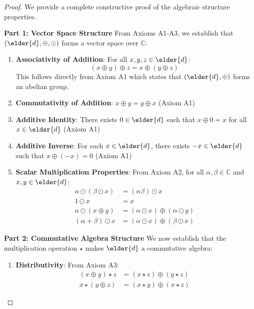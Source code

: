 \begin{proof}
We provide a complete constructive proof of the algebraic structure properties.

\textbf{Part 1: Vector Space Structure}
From Axioms A1-A3, we establish that $(\elder{d}, \oplus, \odot)$ forms a vector space over $\mathbb{C}$:
\begin{enumerate}
    \item \textbf{Associativity of Addition}: For all $x, y, z \in \elder{d}$:
    \begin{equation}
    (x \oplus y) \oplus z = x \oplus (y \oplus z)
    \end{equation}
    This follows directly from Axiom A1 which states that $(\elder{d}, \oplus)$ forms an abelian group.
    
    \item \textbf{Commutativity of Addition}: $x \oplus y = y \oplus x$ (Axiom A1)
    
    \item \textbf{Additive Identity}: There exists $0 \in \elder{d}$ such that $x \oplus 0 = x$ for all $x \in \elder{d}$ (Axiom A1)
    
    \item \textbf{Additive Inverse}: For each $x \in \elder{d}$, there exists $-x \in \elder{d}$ such that $x \oplus (-x) = 0$ (Axiom A1)
    
    \item \textbf{Scalar Multiplication Properties}: From Axiom A2, for all $\alpha, \beta \in \mathbb{C}$ and $x, y \in \elder{d}$:
    \begin{align}
        \alpha \odot (\beta \odot x) &= (\alpha\beta) \odot x \\
        1 \odot x &= x \\
        \alpha \odot (x \oplus y) &= (\alpha \odot x) \oplus (\alpha \odot y) \\
        (\alpha + \beta) \odot x &= (\alpha \odot x) \oplus (\beta \odot x)
    \end{align}
\end{enumerate}

\textbf{Part 2: Commutative Algebra Structure}
We now establish that the multiplication operation $\star$ makes $\elder{d}$ a commutative algebra:

\begin{enumerate}
    \item \textbf{Distributivity}: From Axiom A3:
    \begin{align}
        (x \oplus y) \star z &= (x \star z) \oplus (y \star z) \\
        x \star (y \oplus z) &= (x \star y) \oplus (x \star z)
    \end{align}
    

\end{enumerate}
\end{proof}
